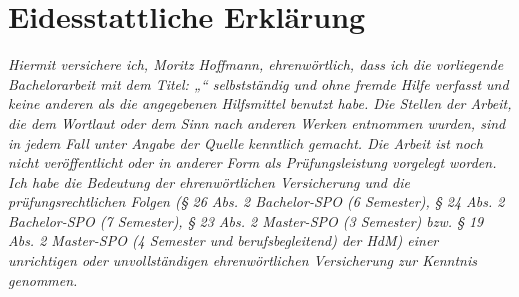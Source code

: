 \documentclass[../main.tex]{subfiles}
\begin{document}
\chapter*{Eidesstattliche Erklärung}
\emph{\glqq{}Hiermit versichere ich, Moritz Hoffmann, ehrenwörtlich, dass ich die vorliegende Bachelorarbeit mit dem Titel: „\Thema“ selbstständig und ohne fremde Hilfe verfasst und keine anderen als die angegebenen Hilfsmittel benutzt habe. Die Stellen der Arbeit, die dem Wortlaut oder dem Sinn nach anderen Werken entnommen wurden, sind in jedem Fall unter Angabe der Quelle kenntlich gemacht. Die Arbeit ist noch nicht veröffentlicht oder in anderer Form als Prüfungsleistung vorgelegt worden. Ich habe die Bedeutung der ehrenwörtlichen Versicherung und die prüfungsrechtlichen Folgen (\S{} 26 Abs. 2 Bachelor-SPO (6 Semester), \S{} 24 Abs. 2 Bachelor-SPO (7 Semester), \S{} 23 Abs. 2 Master-SPO (3 Semester) bzw. \S{} 19 Abs. 2 Master-SPO (4 Semester und berufsbegleitend) der HdM) einer unrichtigen oder unvollständigen ehrenwörtlichen Versicherung zur Kenntnis genommen.\grqq{}}
\vspace{1.5cm}
\signatureAndDate
\newpage
\end{document}
